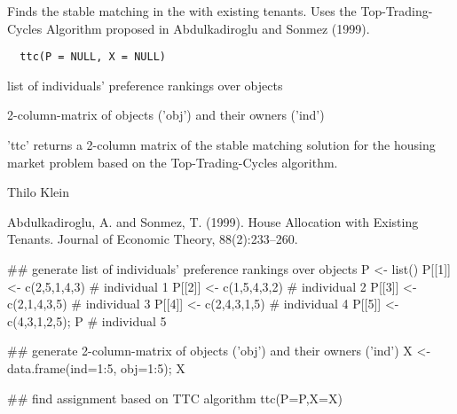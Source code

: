 \documentclass[letterpaper]{book}
\begin{document}
%
\begin{Description}\relax
Finds the stable matching in the
 with existing tenants. Uses the
Top-Trading-Cycles Algorithm proposed in Abdulkadiroglu
and Sonmez (1999).
\end{Description}
%
\begin{Usage}
\begin{verbatim}
  ttc(P = NULL, X = NULL)
\end{verbatim}
\end{Usage}
%
\begin{Arguments}
\begin{ldescription}
\item[\code{P}] list of individuals' preference rankings over
objects

\item[\code{X}] 2-column-matrix of objects ('obj') and their
owners ('ind')
\end{ldescription}
\end{Arguments}
%
\begin{Value}
'ttc' returns a 2-column matrix of the stable matching
solution for the housing market problem based on the
Top-Trading-Cycles algorithm.
\end{Value}
%
\begin{Author}\relax
Thilo Klein 
\end{Author}
%
\begin{References}\relax
Abdulkadiroglu, A. and Sonmez, T. (1999). House
Allocation with Existing Tenants. Journal of Economic
Theory, 88(2):233--260.
\end{References}
%
\begin{Examples}
\begin{ExampleCode}
## generate list of individuals' preference rankings over objects
P <- list()
P[[1]] <- c(2,5,1,4,3)    # individual 1
P[[2]] <- c(1,5,4,3,2)    # individual 2
P[[3]] <- c(2,1,4,3,5)    # individual 3
P[[4]] <- c(2,4,3,1,5)    # individual 4
P[[5]] <- c(4,3,1,2,5); P # individual 5

## generate 2-column-matrix of objects ('obj') and their owners ('ind')
X <- data.frame(ind=1:5, obj=1:5); X

## find assignment based on TTC algorithm
ttc(P=P,X=X)
\end{ExampleCode}
\end{Examples}
\end{document}
